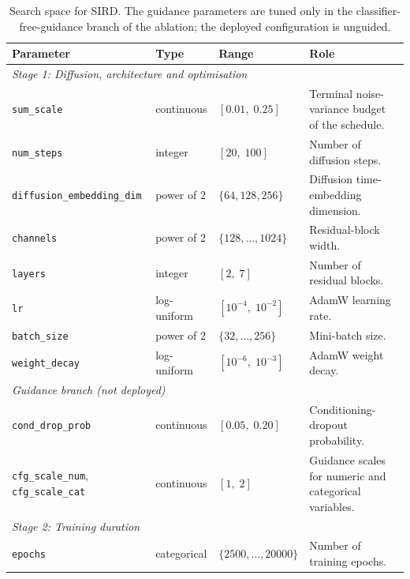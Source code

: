 \begin{table}[ht]
\centering
\caption{Search space for SIRD. The guidance parameters are tuned only in the classifier-free-guidance branch of the ablation; the deployed configuration is unguided.}
\label{tab:tune_sird}
\begin{tabularx}{\textwidth}{lll>{\raggedright\arraybackslash}X}
\toprule
Parameter & Type & Range & Role \\
\midrule
\multicolumn{4}{l}{\textit{Stage 1: Diffusion, architecture and optimisation}} \\
\texttt{sum\_scale} & continuous & $[0.01,\; 0.25]$ &
    Terminal noise-variance budget of the schedule. \\
\texttt{num\_steps} & integer & $[20,\; 100]$ &
    Number of diffusion steps. \\
\texttt{diffusion\_embedding\_dim} & power of 2 & $\{64, 128, 256\}$ &
    Diffusion time-embedding dimension. \\
\texttt{channels} & power of 2 & $\{128, \ldots, 1024\}$ &
    Residual-block width. \\
\texttt{layers} & integer & $[2,\; 7]$ &
    Number of residual blocks. \\
\texttt{lr} & log-uniform & $[10^{-4},\; 10^{-2}]$ &
    AdamW learning rate. \\
\texttt{batch\_size} & power of 2 & $\{32, \ldots, 256\}$ &
    Mini-batch size. \\
\texttt{weight\_decay} & log-uniform & $[10^{-6},\; 10^{-3}]$ &
    AdamW weight decay. \\
\midrule
\multicolumn{4}{l}{\textit{Guidance branch (not deployed)}} \\
\texttt{cond\_drop\_prob} & continuous & $[0.05,\; 0.20]$ &
    Conditioning-dropout probability. \\
\texttt{cfg\_scale\_num}, \texttt{cfg\_scale\_cat} & continuous & $[1,\; 2]$ &
    Guidance scales for numeric and categorical variables. \\
\midrule
\multicolumn{4}{l}{\textit{Stage 2: Training duration}} \\
\texttt{epochs} & categorical & $\{2500, \ldots, 20000\}$ &
    Number of training epochs. \\
\bottomrule
\end{tabularx}
\end{table}

